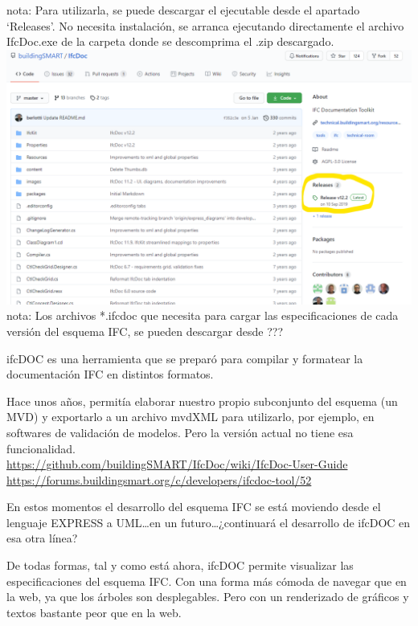 \documentclass[spanish,10pt,a4paper,final,oneside]{article}
\begin{document}
nota: Para utilizarla, se puede descargar el ejecutable desde el apartado `Releases'. No necesita instalación, se arranca ejecutando directamente el archivo IfcDoc.exe de la carpeta donde se descomprima el .zip descargado.
\\ \includegraphics[width=\textwidth]{ifcDOC en github}
\\nota: Los archivos *.ifcdoc que necesita para cargar las especificaciones de cada versión del esquema IFC, se pueden descargar desde ???

\vspace{1cm}

ifcDOC es una herramienta que se preparó para compilar y formatear la documentación IFC en distintos formatos.

Hace unos años, permitía elaborar nuestro propio subconjunto del esquema (un MVD) y exportarlo a un archivo mvdXML para utilizarlo, por ejemplo, en softwares de validación de modelos. Pero la versión actual no tiene esa funcionalidad.
\\ \url{https://github.com/buildingSMART/IfcDoc/wiki/IfcDoc-User-Guide}
\\ \url{https://forums.buildingsmart.org/c/developers/ifcdoc-tool/52}

En estos momentos el desarrollo del esquema IFC se está moviendo desde el lenguaje EXPRESS a UML\ldots en un futuro\ldots ¿continuará el desarrollo de ifcDOC en esa otra línea?

De todas formas, tal y como está ahora, ifcDOC permite visualizar las especificaciones del esquema IFC. Con una forma más cómoda de navegar que en la web, ya que los árboles son desplegables. Pero con un renderizado de gráficos y textos bastante peor que en la web.
\end{document}
